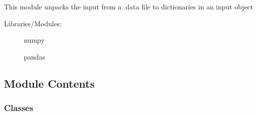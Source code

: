 \documentclass[letterpaper,10pt,english]{sphinxmanual}
\begin{document}
\begin{fulllineitems}

\begin{fulllineitems}
\label{\detokenize{autoapi/ImplicitEuler/index:ImplicitEuler.ImplicitEuler.__init_vars}}
\end{fulllineitems}


\end{fulllineitems}



\section{}
\label{\detokenize{autoapi/Input/index:module-Input}}\label{\detokenize{autoapi/Input/index:input}}\label{\detokenize{autoapi/Input/index::doc}}
\sphinxAtStartPar
This module unpacks the input from a .data file to dictionaries in an input object
\begin{description}
\item[{Libraries/Modules:}] \leavevmode
\sphinxAtStartPar
numpy

\sphinxAtStartPar
pandas

\end{description}


\subsection{Module Contents}
\label{\detokenize{autoapi/Input/index:module-contents}}

\subsubsection{Classes}
\label{\detokenize{autoapi/Input/index:classes}}
\end{document}
